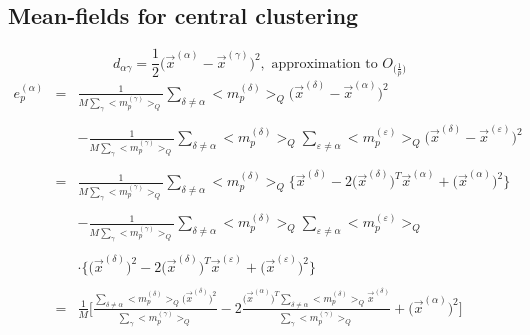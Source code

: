\subsection{Mean-fields for central clustering}
\begin{equation}
	d_{\alpha\gamma} = \frac{1}{2} \big( \vec{x}^{(\alpha)} 
		- \vec{x}^{(\gamma)} \big)^2, \text{ approximation to }
		O_{\big( \frac{1}{p} \big)}
\end{equation}
\begin{equation}
	\begin{array}{lll}
	e_p^{(\alpha)}
	& = & \frac{1}{M \sum\limits_\gamma \big< m_p^{(\gamma)} \big>_Q}
		\sum\limits_{\delta \neq \alpha} \big< m_p^{(\delta)}
		\big>_Q \big( \vec{x}^{(\delta)} - \vec{x}^{(\alpha)} \big)^2
		\\\\
	&& -\frac{1}{M \sum\limits_\gamma \big< m_p^{(\gamma)} \big>_Q}
		\sum\limits_{\delta \neq \alpha} \big< m_p^{(\delta)} \big>_Q
		\sum\limits_{\varepsilon \neq \alpha} \big<m_p^{(\varepsilon)}
		\big>_Q \big( \vec{x}^{(\delta)} 
		- \vec{x}^{(\varepsilon)} \big)^2 \\\\
	& = & \frac{1}{M \sum\limits_\gamma \big< m_p^{(\gamma)} \big>_Q}
		\sum\limits_{\delta \neq \alpha} \big< m_p^{(\delta)}
		\big>_Q \bigg\{ \vec{x}^{(\delta)} - 2\big(\vec{x}^{(\delta)}
			\big)^T \vec{x}^{(\alpha)} + \big(\vec{x}^{(\alpha)}
			\big)^2\bigg\} \\\\
	&& -\frac{1}{M \sum\limits_\gamma \big< m_p^{(\gamma)} \big>_Q}
		\sum\limits_{\delta \neq \alpha} \big< m_p^{(\delta)}
		\big>_Q \sum\limits_{\varepsilon \neq \alpha}
			\big< m_p^{(\varepsilon)} \big>_Q \\\\
	&& \cdot\bigg\{ \big( \vec{x}^{(\delta)} \big)^2 
			- 2\big(\vec{x}^{(\delta)}
			\big)^T \vec{x}^{(\varepsilon)} 
			+ \big(\vec{x}^{(\varepsilon)} \big)^2\bigg\} \\\\
	& = & \frac{1}{M} \Bigg[ \frac{\sum\limits_{\delta \neq \alpha} 
		\big< m_p^{(\delta)} \big>_Q \big(\vec{x}^{(\delta)} \big)^2 }{
			\sum\limits_\gamma \big< m_p^{(\gamma)} \big>_Q}
		-2 \frac{\big(\vec{x}^{(\alpha)} \big)^T 
			\sum\limits_{\delta \neq \alpha} 
			\big< m_p^{(\delta)} \big>_Q \vec{x}^{(\delta)}}{
				\sum\limits_\gamma \big< m_p^{(\gamma)}
				\big>_Q} + \big( \vec{x}^{(\alpha)} \big)^2
			\Bigg] \\\\

\end{array}
\end{equation}
